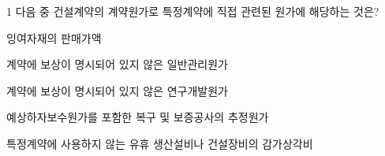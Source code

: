 \begin{question}{1}
다음 중 건설계약의 계약원가로 특정계약에 직접 관련된 원가에 해당하는 것은?
\begin{choices}
  \item 잉여자재의 판매가액
  \item 계약에 보상이 명시되어 있지 않은 일반관리원가
  \item 계약에 보상이 명시되어 있지 않은 연구개발원가
  \item 예상하자보수원가를 포함한 복구 및 보증공사의 추정원가
  \item 특정계약에 사용하지 않는 유휴 생산설비나 건설장비의 감가상각비
\end{choices}
\end{question}
